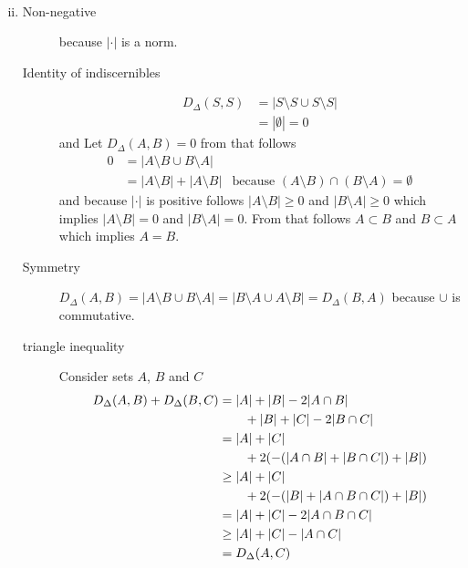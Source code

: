 \documentclass[10pt,a4paper,boxed]{hmcpset}
\begin{document}
\begin{solution}
\begin{enumerate}[(i)]
\begin{description}
\begin{align*}
							\end{align*}
					\end{description}
				\item 
					\begin{description}
						\item[Non-negative] because $|\cdot|$ is a norm.
						\item[Identity of indiscernibles] 
							\begin{align}
								D_\Delta(S,S) &= |S\setminus S \cup S\setminus S| \\
															&= | \emptyset	| = 0
							\end{align}
							and
							Let $D_\Delta(A,B) = 0$ from that follows 
							\begin{align}
								 0 &= |A\setminus B \cup B \setminus A| \\
								 &= | A \setminus B| + | A \setminus B| & \text{because } (A \setminus B) \cap (B \setminus A) = \emptyset \label{leererschnitt}
							\end{align}
							and because $| \cdot |$ is positive follows $|A \setminus B| \geq 0$ and $|B\setminus A| \geq 0$ which implies
							$|A \setminus B| = 0$ and $|B\setminus A| = 0$. From that follows $A \subset B$ and $B \subset A$ which implies $A=B$.
						\item[Symmetry] $D_\Delta(A,B) = |A \setminus B \cup B \setminus A| = | B \setminus A \cup A \setminus B| = D_\Delta(B,A)$ because $\cup$ is commutative.
						\item[triangle inequality]							
							Consider sets $A$, $B$ and $C$ 
							\begin{align}
								D_\Delta(A,B) + D_\Delta(B,C) &= |A| + |B| - 2|A \cap B| \notag\\ & \qquad + |B| + |C| - 2 |B \cap C| \\
								& = |A| + |C| \notag \\ & \qquad + 2 ( -( |A \cap B| + |B \cap C| ) + |B|) \\
								& \geq |A| + |C| \notag \\ & \qquad + 2 ( - (|B| + |A\cap B \cap C| ) + |B|) \\
								& = |A| + |C| - 2 |A \cap B \cap C| \\
								& \geq |A| + |C| - |A \cap C| \\
							  & = D_\Delta(A,C)
							\end{align}
					\end{description}
			\end{enumerate}
		\end{solution}

	
\end{document}
